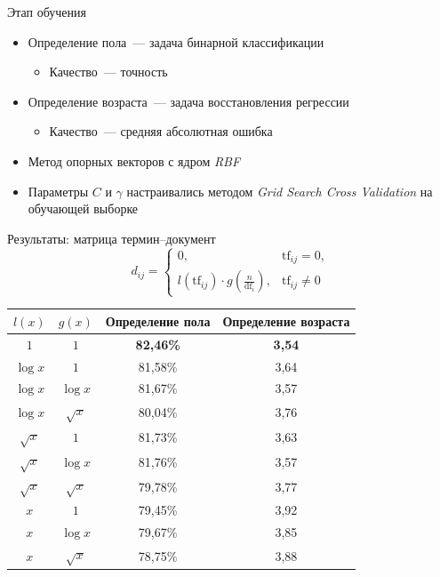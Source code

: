 \documentclass{beamer}
\begin{document}
\begin{frame}{Этап обучения}
  \begin{itemize}
      \item {Определение пола~--- задача бинарной классификации}
          \begin{itemize}
              \item {Качество~--- точность}
          \end{itemize}
      \item {Определение возраста~--- задача восстановления регрессии}
          \begin{itemize}
              \item {Качество~--- средняя абсолютная ошибка}
          \end{itemize}
      \pause
      \item {Метод опорных векторов с ядром \textit{RBF}}
      \pause
      \item {Параметры $C$ и $\gamma$ настраивались методом \textit{Grid Search Cross Validation} на обучающей выборке}
  \end{itemize}
\end{frame}

\begin{frame}{Результаты: матрица термин--документ}
    \[d_{ij} = \begin{cases}
              0,& \mathrm{tf}_{ij} = 0,\\
              l(\mathrm{tf}_{ij}) \cdot g(\frac{n}{\mathrm{df}_{i}}),& \mathrm{tf}_{ij} \ne 0
        \end{cases}\]
    \begin{table}[h!]
    \centering
    \begin{tabular}{|c|c|c|c|}
    \hline
    \boldmath$l(x)$ & \boldmath$g(x)$ & \textbf{Определение пола} & \textbf{Определение возраста} \tabularnewline
    \hline
    $1$ & $1$ & \textbf{82,46\%} & \textbf{3,54} \tabularnewline
    \hline
    $\log{x}$ & $1$ & 81,58\% & 3,64 \tabularnewline
    \hline
    $\log{x}$ & $\log{x}$ & 81,67\% & 3,57 \tabularnewline
    \hline
    $\log{x}$ & $\sqrt{x}$ & 80,04\% & 3,76 \tabularnewline
    \hline
    $\sqrt{x}$ & $1$ & 81,73\% & 3,63 \tabularnewline
    \hline
    $\sqrt{x}$ & $\log{x}$ & 81,76\% & 3,57 \tabularnewline
    \hline
    $\sqrt{x}$ & $\sqrt{x}$ & 79,78\% & 3,77 \tabularnewline
    \hline
    $x$ & $1$ & 79,45\% & 3,92 \tabularnewline
    \hline
    $x$ & $\log{x}$ & 79,67\% & 3,85 \tabularnewline
    \hline
    $x$ & $\sqrt{x}$ & 78,75\% & 3,88 \tabularnewline
    \hline
    \end{tabular}
    \label{tab:tfidf_results}
    \end{table}
\end{frame}
\end{document}
